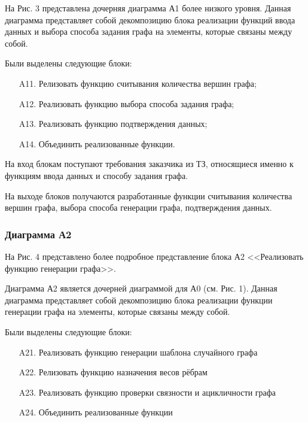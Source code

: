 \documentclass[a4paper, final]{article}
\begin{document}
На Рис. 3 представлена дочерняя диаграмма А1 более низкого уровня. Данная диаграмма представляет собой 
декомпозицию блока реализации функций ввода данных и выбора способа задания графа на элементы, которые связаны 
между собой. 

Были выделены следующие блоки:
\begin{itemize}
	\item[A11.] Релизовать функцию считывания количества вершин графа;
	\item[A12.] Реализовать функцию выбора способа задания графа;
	\item[A13.] Реализовать функцию подтверждения данных;
	\item[A14.] Объединить реализованные функции.
\end{itemize} 

На вход блокам поступают требования заказчика из ТЗ, относящиеся именно к функциям ввода данных и способу 
задания графа.

На выходе блоков получаются разработанные функции считывания количества вершин графа, выбора способа генерации графа,
подтверждения данных.

\newpage
\hypertarget{img:A1}{}



\subsubsection{Диаграмма А2}
На Рис. 4 представлено более подробное представление блока А2 <<Реализовать функцию генерации графа>>.

Диаграмма А2 является дочерней диаграммой для А0 (см. Рис. 1). Данная диаграмма представляет собой декомпозицию
блока реализации функции генерации графа на элементы, которые связаны между собой. 

Были выделены следующие блоки:
\begin{itemize}
	\item[A21.] Реализовать функцию генерации шаблона случайного графа
	\item[A22.] Релизовать функцию назначения весов рёбрам
	\item[A23.] Реализовать функцию проверки связности и ацикличности графа
	\item[A24.] Объединить реализованные функции
\end{itemize} 

\newpage
\hypertarget{img:A2}{}



\cleardoublepage
{}
\newpage
{}
\end{document}
